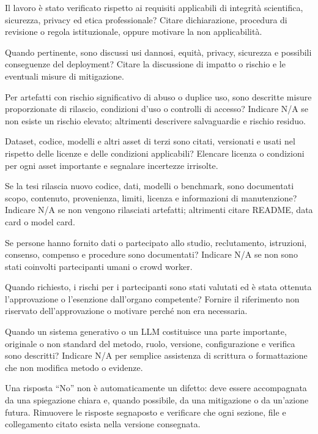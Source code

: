 \begin{reproducibilitychecklist}
{Il lavoro \`e stato verificato rispetto ai requisiti applicabili di integrit\`a
scientifica, sicurezza, privacy ed etica professionale?}
{Citare dichiarazione, procedura di revisione o regola istituzionale, oppure motivare la non applicabilit\`a.}

{Quando pertinente, sono discussi usi dannosi, equit\`a, privacy, sicurezza e
possibili conseguenze del deployment?}
{Citare la discussione di impatto o rischio e le eventuali misure di mitigazione.}

{Per artefatti con rischio significativo di abuso o duplice uso, sono descritte
misure proporzionate di rilascio, condizioni d'uso o controlli di accesso?}
{Indicare N/A se non esiste un rischio elevato; altrimenti descrivere salvaguardie e rischio residuo.}

{Dataset, codice, modelli e altri asset di terzi sono citati, versionati e usati
nel rispetto delle licenze e delle condizioni applicabili?}
{Elencare licenza o condizioni per ogni asset importante e segnalare incertezze irrisolte.}

{Se la tesi rilascia nuovo codice, dati, modelli o benchmark, sono documentati
scopo, contenuto, provenienza, limiti, licenza e informazioni di manutenzione?}
{Indicare N/A se non vengono rilasciati artefatti; altrimenti citare README, data card o model card.}

{Se persone hanno fornito dati o partecipato allo studio, reclutamento,
istruzioni, consenso, compenso e procedure sono documentati?}
{Indicare N/A se non sono stati coinvolti partecipanti umani o crowd worker.}

{Quando richiesto, i rischi per i partecipanti sono stati valutati ed \`e stata
ottenuta l'approvazione o l'esenzione dall'organo competente?}
{Fornire il riferimento non riservato dell'approvazione o motivare perch\'e non era necessaria.}

{Quando un sistema generativo o un LLM costituisce una parte importante,
originale o non standard del metodo, ruolo, versione, configurazione e verifica
sono descritti?}
{Indicare N/A per semplice assistenza di scrittura o formattazione che non modifica metodo o evidenze.}

\end{reproducibilitychecklist}

\begin{keypoint}
Una risposta ``No'' non \`e automaticamente un difetto: deve essere accompagnata
da una spiegazione chiara e, quando possibile, da una mitigazione o da un'azione
futura. Rimuovere le risposte segnaposto e verificare che ogni sezione, file e
collegamento citato esista nella versione consegnata.
\end{keypoint}
